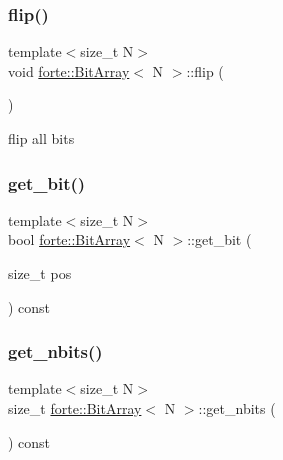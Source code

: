 \subsubsection{\texorpdfstring{flip()}{flip()}}
{\footnotesize\ttfamily template$<$size\+\_\+t N$>$ \\
void \mbox{\hyperlink{classforte_1_1_bit_array}{forte\+::\+Bit\+Array}}$<$ N $>$\+::flip (\begin{DoxyParamCaption}{ }\end{DoxyParamCaption})\hspace{0.3cm}{\ttfamily [inline]}}



flip all bits 

\mbox{\label{classforte_1_1_bit_array_a6763512d765e8dbd07d7f70ed3bb1950}} 
\subsubsection{\texorpdfstring{get\+\_\+bit()}{get\_bit()}}
{\footnotesize\ttfamily template$<$size\+\_\+t N$>$ \\
bool \mbox{\hyperlink{classforte_1_1_bit_array}{forte\+::\+Bit\+Array}}$<$ N $>$\+::get\+\_\+bit (\begin{DoxyParamCaption}\item[{size\+\_\+t}]{pos }\end{DoxyParamCaption}) const\hspace{0.3cm}{\ttfamily [inline]}}

\mbox{\label{classforte_1_1_bit_array_a2adc17f21cc178cf6450d74e5629884d}} 
\subsubsection{\texorpdfstring{get\+\_\+nbits()}{get\_nbits()}}
{\footnotesize\ttfamily template$<$size\+\_\+t N$>$ \\
size\+\_\+t \mbox{\hyperlink{classforte_1_1_bit_array}{forte\+::\+Bit\+Array}}$<$ N $>$\+::get\+\_\+nbits (\begin{DoxyParamCaption}{ }\end{DoxyParamCaption}) const\hspace{0.3cm}{\ttfamily [inline]}}



